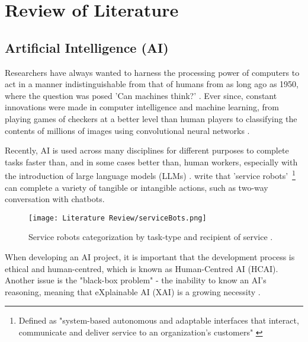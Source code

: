 




\section{Review of Literature}

\subsection{Artificial Intelligence (AI)}

Researchers have always wanted to harness the processing power of computers to act in a manner 
indistinguishable from that of humans from as long ago as 1950, where the question was posed 
'Can machines think?' \autocite{turing_icomputing_1950}. Ever since, constant innovations were made in computer 
intelligence and machine learning, from playing games of checkers at a better level than human players \autocite{samuel_studies_1959}
to classifying the contents of millions of images using convolutional neural networks \autocite{krizhevsky_imagenet_2012}.

Recently, AI is used across many disciplines for different purposes to complete tasks faster than, and in some cases better than,
human workers, especially with the introduction of large language models (LLMs) \autocite{AIDigitalAssistants}. \textcite{wirtz_brave_2018} write that 'service robots'~\footnote{Defined as "system-based autonomous and adaptable interfaces that 
interact, communicate and deliver service to an organization’s customers" \autocite[p.909]{wirtz_brave_2018}} can complete a variety of 
tangible or intangible actions, such as two-way conversation with chatbots.

\begin{figure}[H]
    \centering
    \texttt{[image: Literature Review/serviceBots.png]}
    \caption{Service robots categorization by task-type and recipient of service \autocite{wirtz_brave_2018}.}
    \label{fig:serviceBots}
\end{figure}

When developing an AI project, it is important that the development process
is ethical and human-centred, which is known as Human-Centred AI (HCAI). 
Another issue is the "black-box problem" - the inability to know an AI's reasoning, meaning that 
eXplainable AI (XAI) is a growing necessity \autocite{miro-nicolau_comprehensive_2025}. 

